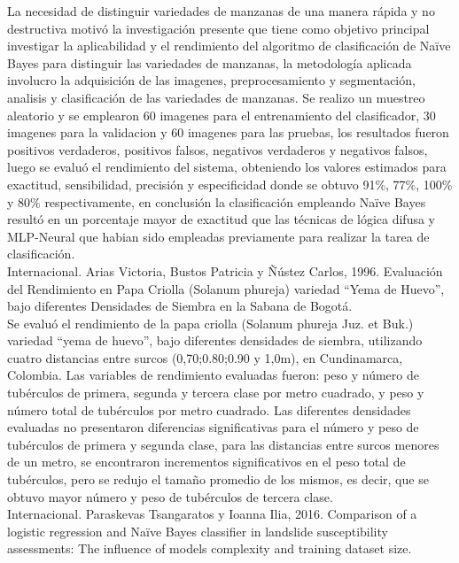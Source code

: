 La necesidad de distinguir variedades de manzanas de una manera rápida y no destructiva motivó la investigación presente que tiene como objetivo principal investigar la aplicabilidad y el rendimiento del algoritmo de clasificación de Naïve Bayes para distinguir las variedades de manzanas, la metodología aplicada involucro la adquisición de las imagenes, preprocesamiento y segmentación, analisis y clasificación de las variedades de manzanas. Se realizo un muestreo aleatorio y se emplearon 60 imagenes para el entrenamiento del clasificador, 30 imagenes para la validacion y 60 imagenes para las pruebas, los resultados fueron positivos verdaderos, positivos falsos, negativos verdaderos y negativos falsos, luego se evaluó el rendimiento del sistema, obteniendo los valores estimados para exactitud, sensibilidad, precisión y especificidad donde se obtuvo 91\%, 77\%, 100\% y 80\% respectivamente, en conclusión la clasificación empleando Naïve Bayes resultó en un porcentaje mayor de exactitud que las técnicas de lógica difusa y MLP-Neural que habian sido empleadas previamente para realizar la tarea de clasificación.\\

Internacional. Arias Victoria, Bustos Patricia y Ñústez Carlos, 1996. Evaluación del Rendimiento en Papa Criolla (Solanum phureja) variedad "`Yema de Huevo"', bajo diferentes Densidades de Siembra en la Sabana de Bogotá.\\

Se evaluó el rendimiento de la papa criolla (Solanum phureja Juz. et Buk.) variedad "`yema de huevo"', bajo diferentes densidades de siembra, utilizando cuatro distancias entre surcos (0,70;0.80;0.90 y 1,0m), en Cundinamarca, Colombia. Las variables de rendimiento evaluadas fueron: peso y número de tubérculos de primera, segunda y tercera clase por metro cuadrado, y peso y número total de tubérculos por metro cuadrado. Las diferentes densidades evaluadas no presentaron diferencias significativas para el número y peso de tubérculos de primera y segunda clase, para las distancias entre surcos menores de un metro, se encontraron incrementos significativos en el peso total de tubérculos, pero se redujo el tamaño promedio de los mismos, es decir, que se obtuvo mayor número y peso de tubérculos de tercera clase.\\ 

Internacional. Paraskevas Tsangaratos y Ioanna Ilia, 2016. Comparison of a logistic regression and Naïve Bayes classifier in landslide susceptibility assessments: The influence of models complexity and training dataset size.\\ 


